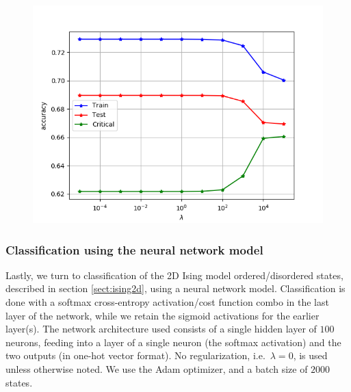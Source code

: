 \documentclass[a4paper, twocolumn]{article}
\begin{document}
\begin{figure}[h!]
\centering
 \includegraphics[width=1\linewidth]{logReg_acc_vs_regstrength_Final.png}
 \label{MehtaComparison}
\end{figure}

\begin{figure}[h!]
\centering
 \label{logRegNoIntercept}
\end{figure}

\subsubsection{Classification using the neural network model}
Lastly, we turn to classification of the 2D Ising model ordered/disordered states, described in section \ref{sect:ising2d}, using a neural network model. Classification is done with a softmax cross-entropy activation/cost function combo in the last layer of the network, while we retain the sigmoid activations for the earlier layer(s). The network architecture used consists of a single hidden layer of $100$ neurons, feeding into a layer of a single neuron (the softmax activation) and the two outputs (in one-hot vector format). No regularization, i.e.\ $\lambda=0$, is used unless otherwise noted. We use the Adam optimizer, and a batch size of $2000$ states. 
\end{document}
